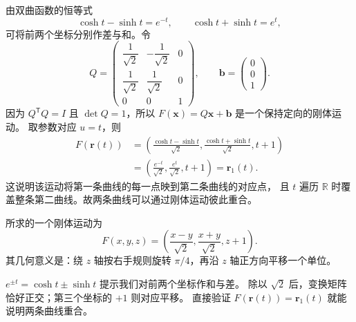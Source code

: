 \begin{solution}
由双曲函数的恒等式
\[
\cosh t-\sinh t=e^{-t},\qquad
\cosh t+\sinh t=e^t,
\]
可将前两个坐标分别作差与和。令
\[
Q=\begin{pmatrix}
\dfrac1{\sqrt2}&-\dfrac1{\sqrt2}&0\\[4pt]
\dfrac1{\sqrt2}&\dfrac1{\sqrt2}&0\\[4pt]
0&0&1
\end{pmatrix},\qquad
\bm b=\begin{pmatrix}0\\0\\1\end{pmatrix}.
\]
因为 $Q^{\mathsf T}Q=I$ 且 $\det Q=1$，所以
$F(\bm x)=Q\bm x+\bm b$ 是一个保持定向的刚体运动。
取参数对应 $u=t$，则
\begin{align*}
F(\bm r(t))
&=\left(\frac{\cosh t-\sinh t}{\sqrt2},
\frac{\cosh t+\sinh t}{\sqrt2},t+1\right)\\[3pt]
&=\left(\frac{e^{-t}}{\sqrt2},\frac{e^t}{\sqrt2},t+1\right)
=\bm r_1(t).
\end{align*}
这说明该运动将第一条曲线的每一点映到第二条曲线的对应点，
且 $t$ 遍历 $\mathbb R$ 时覆盖整条第二曲线。故两条曲线可以通过刚体运动彼此重合。

所求的一个刚体运动为
\[
\boxed{F(x,y,z)=\left(\frac{x-y}{\sqrt2},\frac{x+y}{\sqrt2},z+1\right)}.
\]
其几何意义是：绕 $z$ 轴按右手规则旋转 $\pi/4$，再沿 $z$ 轴正方向平移一个单位。
\end{solution}

\begin{dxtips}[用和与差识别旋转]\label{hw:curves:tip6}
$e^{\pm t}=\cosh t\pm\sinh t$ 提示我们对前两个坐标作和与差。
除以 $\sqrt2$ 后，变换矩阵恰好正交；第三个坐标的 $+1$ 则对应平移。
直接验证 $F(\bm r(t))=\bm r_1(t)$ 就能说明两条曲线重合。
\end{dxtips}

\endgroup

